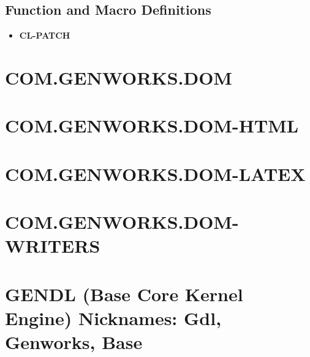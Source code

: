 \documentclass [11pt]{book}
\begin{document}
\subsection{Function and Macro Definitions}

\label{subsec:functionandmacrodefinitions}



\begin{itemize}

\item {}
\textbf{CL-PATCH}





\end{itemize}





\section{COM.GENWORKS.DOM }

\label{sec:com.genworks.dom}







\section{COM.GENWORKS.DOM-HTML }

\label{sec:com.genworks.dom-html}







\section{COM.GENWORKS.DOM-LATEX }

\label{sec:com.genworks.dom-latex}







\section{COM.GENWORKS.DOM-WRITERS }

\label{sec:com.genworks.dom-writers}







\section{GENDL (Base Core Kernel Engine) Nicknames: Gdl, Genworks, Base}
\end{document}
